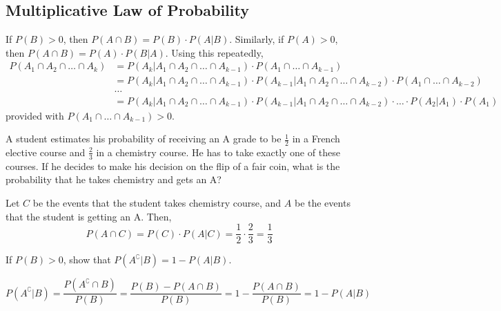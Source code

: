 \subsection{Multiplicative Law of Probability}
If $P(B) > 0$, then $P(A \cap B) = P(B) \cdot P(A \vert B)$. Similarly, if
$P(A) > 0$, then $P(A \cap B) = P(A) \cdot P(B \vert A)$. Using this
repeatedly,
\begin{align*}
    P(A_1 \cap A_2 \cap \dots \cap A_k) 
    &= P(A_k \vert A_1 \cap A_2 \cap \dots \cap A_{k-1}) \cdot
       P(A_1 \cap \dots \cap A_{k-1})                                        \\
    &= P(A_k \vert A_1 \cap A_2 \cap \dots \cap A_{k-1}) \cdot
       P(A_{k-1} \vert A_1 \cap A_2 \cap \dots \cap A_{k-2}) \cdot
       P(A_1 \cap \dots \cap A_{k-2})                                        \\
    &\dots                                                                   \\
    &= P(A_k \vert A_1 \cap A_2 \cap \dots \cap A_{k-1}) \cdot
       P(A_{k-1} \vert A_1 \cap A_2 \cap \dots \cap A_{k-2}) \cdot
       \dots \cdot
       P(A_2 \vert A_1) \cdot
       P(A_1)
\end{align*}
provided with $P(A_1 \cap \dots \cap A_{k-1}) > 0$.

\begin{example}
    A student estimates his probability of receiving an A grade to be
$\frac{1}{2}$ in a French elective course and $\frac{2}{3}$ in a chemistry
course. He has to take exactly one of these courses. If he decides to make his 
decision on the flip of a fair coin, what is the probability that he takes
chemistry and gets an A?
\end{example}
\begin{solution}
    Let $C$ be the events that the student takes chemistry course, and $A$ be
the events that the student is getting an A. Then, 
\begin{equation*}
    P(A \cap C) = P(C) \cdot P(A \vert C)
                = \frac{1}{2} \cdot \frac{2}{3}
                = \frac{1}{3}
\end{equation*}
\end{solution}

\begin{example}
    If $P(B) > 0$, show that $P(A^\complement \vert B) = 1 - P(A \vert B)$.
\end{example}
\begin{solution}
    \begin{equation*}
        P(A^\complement \vert B) 
        = \frac{P(A^\complement \cap B)}{P(B)}                              
        = \frac{P(B) - P(A \cap B)}{P(B)}                                   
        = 1 - \frac{P(A \cap B)}{P(B)}                                      
        = 1 - P(A \vert B)
    \end{equation*}
\end{solution}


